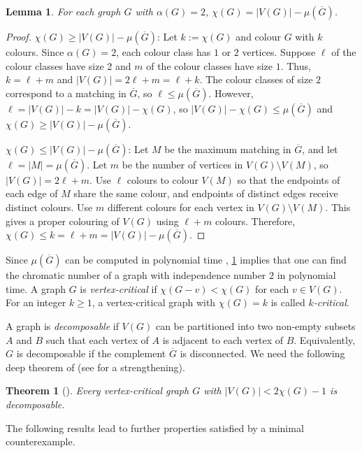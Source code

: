 \documentclass[11pt]{article}
\numberwithin{equation}{section}
\theoremstyle{plain}
\newtheorem{thm}[equation]{Theorem}
\newtheorem{lem}[equation]{Lemma}
\theoremstyle{definition}
\renewcommand{\geq}{\geqslant}
\renewcommand{\leq}{\leqslant}
\newcommand{\defn}[1]{\textcolor{green!50!black}{\textit{#1}}}
\begin{document}
\begin{lem}
    \label{lem:chromatic_matching}
    For each graph $G$ with $\alpha(G) = 2$, $\chi(G) = |V(G)| - \mu(\overline{G})$.
\end{lem}
\begin{proof}
    $\chi(G) \geq |V(G)| - \mu(\overline{G})$: Let $k:= \chi(G)$ and colour $G$ with $k$ colours. Since $\alpha(G) = 2$, each colour class has $1$ or $2$ vertices. Suppose $\ell$ of the colour classes have size $2$ and $m$ of the colour classes have size $1$. Thus, $k = \ell + m$ and $|V(G)| = 2\ell + m = \ell + k$. The colour classes of size $2$ correspond to a matching in $\overline{G}$, so $\ell \leq \mu(\overline{G})$. However, $\ell = |V(G)| - k = |V(G)| - \chi(G)$, so $|V(G)| - \chi(G) \leq \mu(\overline{G})$ and $\chi(G) \geq |V(G)| - \mu(\overline{G})$.

    $\chi(G) \leq |V(G)| - \mu(\overline{G})$: Let $M$ be the maximum matching in $\overline{G}$, and let $\ell = |M| = \mu(\overline{G})$. Let $m$ be the number of vertices in $V(G) \setminus V(M)$, so $|V(G)|=  2 \ell + m$. Use $\ell$ colours to colour $V(M)$ so that the endpoints of each edge of $M$ share the same colour, and endpoints of distinct edges receive distinct colours. Use $m$ different colours for each vertex in $V(G) \setminus V(M)$. This gives a proper colouring of $V(G)$ using $\ell + m$ colours. Therefore, $\chi(G) \leq k = \ell + m = |V(G)| - \mu(\overline{G})$.
\end{proof}
Since $\mu(\overline{G})$ can be computed in polynomial time \citep{Edmonds65a}, \cref{lem:chromatic_matching} implies that one can find the chromatic number of a graph with independence number $2$ in polynomial time. A graph $G$ is \defn{vertex-critical} if $\chi(G - v) < \chi(G)$ for each $v \in V(G)$. For an integer $k \geq 1$, a vertex-critical graph with $\chi(G) = k$ is called \defn{$k$-critical}.

A graph is \defn{decomposable} if $V(G)$ can be partitioned into two non-empty subsets $A$ and $B$ such that each vertex of $A$ is adjacent to each vertex of $B$. Equivalently, $G$ is decomposable if the complement $\overline{G}$ is disconnected. We need the following deep theorem of \citet{gallai_kristische_1963} (see  \citet{stehlik_critical_2003} for a strengthening).

\begin{thm}[\citet{gallai_kristische_1963}]
    \label{thm:deep_theorem_of_gallai}
    Every vertex-critical graph $G$ with $|V(G)| < 2\chi(G) - 1$ is decomposable.
\end{thm}
The following results lead to further properties satisfied by a minimal counterexample.
\end{document}
